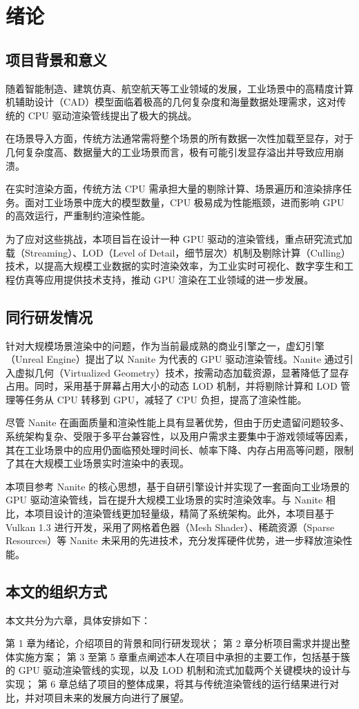 \cleardoublepage

\section{绪论}

\subsection{项目背景和意义}
随着智能制造、建筑仿真、航空航天等工业领域的发展，工业场景中的高精度计算机辅助设计（CAD）模型面临着极高的几何复杂度和海量数据处理需求\cite{CAD}，这对传统的 CPU 驱动渲染管线提出了极大的挑战。

在场景导入方面，传统方法通常需将整个场景的所有数据一次性加载至显存，对于几何复杂度高、数据量大的工业场景而言，极有可能引发显存溢出并导致应用崩溃。

在实时渲染方面，传统方法 CPU 需承担大量的剔除计算、场景遍历和渲染排序任务。面对工业场景中庞大的模型数量，CPU 极易成为性能瓶颈，进而影响 GPU 的高效运行，严重制约渲染性能\cite{WangWei2011}\cite{Tian2024}。

为了应对这些挑战，本项目旨在设计一种 GPU 驱动的渲染管线，重点研究流式加载（Streaming）、LOD（Level of Detail，细节层次）机制及剔除计算（Culling）技术，以提高大规模工业数据的实时渲染效率，为工业实时可视化、数字孪生和工程仿真等应用提供技术支持，推动 GPU 渲染在工业领域的进一步发展。

\subsection{同行研发情况}

针对大规模场景渲染中的问题，作为当前最成熟的商业引擎之一，虚幻引擎（Unreal Engine）提出了以 Nanite 为代表的 GPU 驱动渲染管线\cite{Nanite2022}。Nanite 通过引入虚拟几何（Virtualized Geometry）技术，按需动态加载资源，显著降低了显存占用。同时，采用基于屏幕占用大小的动态 LOD 机制\cite{Overton2024}，并将剔除计算和 LOD 管理等任务从 CPU 转移到 GPU，减轻了 CPU 负担，提高了渲染性能。

尽管 Nanite 在画面质量和渲染性能上具有显著优势，但由于历史遗留问题较多、系统架构复杂、受限于多平台兼容性，以及用户需求主要集中于游戏领域等因素，其在工业场景中的应用仍面临预处理时间长、帧率下降、内存占用高等问题，限制了其在大规模工业场景实时渲染中的表现\cite{mattrg2023}。

本项目参考 Nanite 的核心思想，基于自研引擎设计并实现了一套面向工业场景的 GPU 驱动渲染管线，旨在提升大规模工业场景的实时渲染效率。与 Nanite 相比，本项目设计的渲染管线更加轻量级，精简了系统架构。此外，本项目基于 Vulkan 1.3 进行开发，采用了网格着色器（Mesh Shader）、稀疏资源（Sparse Resources）等 Nanite 未采用的先进技术，充分发挥硬件优势，进一步释放渲染性能。

\subsection{本文的组织方式}

本文共分为六章，具体安排如下：

第 1 章为绪论，介绍项目的背景和同行研发现状；
第 2 章分析项目需求并提出整体实施方案；
第 3 至第 5 章重点阐述本人在项目中承担的主要工作，包括基于簇的 GPU 驱动渲染管线的实现，以及 LOD 机制和流式加载两个关键模块的设计与实现；
第 6 章总结了项目的整体成果，将其与传统渲染管线的运行结果进行对比，并对项目未来的发展方向进行了展望。